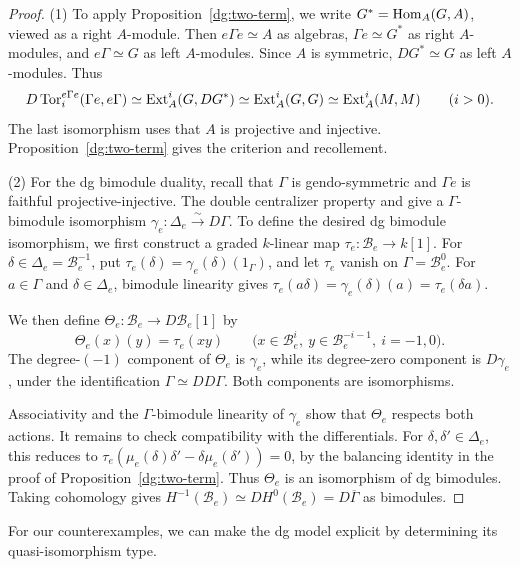 \documentclass[11pt]{article}
\begin{document}
\begin{proof}
\textup{(1)} To apply Proposition~\ref{dg:two-term}, we write
$G^*={\rm Hom}_A(G,A)$, viewed as a right $A$-module.
Then $e\Gamma e\simeq A$ as algebras,
$\Gamma e\simeq G^*$ as right $A$-modules, and
$e\Gamma\simeq G$ as left $A$-modules.
Since $A$ is symmetric, $DG^*\simeq G$ as left $A$-modules. Thus
\[
 D\operatorname{Tor}^{e\Gamma e}_i(\Gamma e,e\Gamma)
 \simeq{\rm Ext}_A^i(G,DG^*)
 \simeq{\rm Ext}_A^i(G,G)
 \simeq{\rm Ext}_A^i(M,M)
 \qquad(i>0).
\]
The last isomorphism uses that $A$ is projective and injective.
Proposition~\ref{dg:two-term} gives the criterion and recollement.

\textup{(2)} For the dg bimodule duality, recall that $\Gamma$ is gendo-symmetric
and $\Gamma e$ is faithful projective-injective. The double centralizer property and
\cite[Lemma~5.1(2)]{CFX} give a $\Gamma$-bimodule isomorphism
$\gamma_e:\Delta_e\xrightarrow{\sim}D\Gamma$.
To define the desired dg bimodule isomorphism, we first construct
a graded $k$-linear map $\tau_e:\mathcal B_e\to k[1]$.
For $\delta\in\Delta_e=\mathcal B_e^{-1}$, put
$\tau_e(\delta)=\gamma_e(\delta)(1_\Gamma)$, and let $\tau_e$
vanish on $\Gamma=\mathcal B_e^0$.
For $a\in\Gamma$ and $\delta\in\Delta_e$, bimodule linearity gives
$\tau_e(a\delta)=\gamma_e(\delta)(a)=\tau_e(\delta a)$.

We then define $\Theta_e:\mathcal B_e\to D\mathcal B_e[1]$ by
\[
 \Theta_e(x)(y)=\tau_e(xy)
 \qquad\bigl(x\in\mathcal B_e^i,\ y\in\mathcal B_e^{-i-1},\ i=-1,0\bigr).
\]
The degree-$(-1)$ component of $\Theta_e$ is $\gamma_e$, while
its degree-zero component is $D\gamma_e$, under the identification
$\Gamma\simeq DD\Gamma$. Both components are isomorphisms.

Associativity and the $\Gamma$-bimodule linearity of $\gamma_e$
show that $\Theta_e$ respects both actions.
It remains to check compatibility with the differentials.
For $\delta,\delta'\in\Delta_e$, this reduces to
$\tau_e(\mu_e(\delta)\delta'-\delta\mu_e(\delta'))=0$,
by the balancing identity in the proof of Proposition~\ref{dg:two-term}.
Thus $\Theta_e$ is an isomorphism of dg bimodules.
Taking cohomology gives
$H^{-1}(\mathcal B_e)\simeq DH^0(\mathcal B_e)=D\overline\Gamma$
as bimodules.
\end{proof}

For our counterexamples, we can make the dg model explicit by
determining its quasi-isomorphism type.
\end{document}
